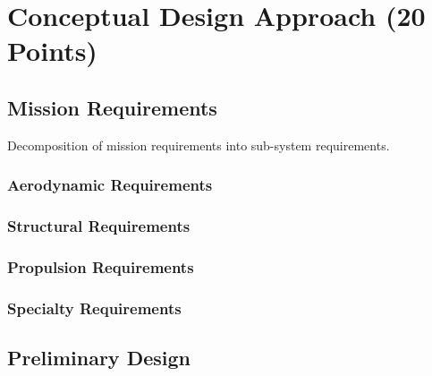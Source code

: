 \documentclass[proposal]{byu-aero}
\begin{document}
\section{Conceptual Design Approach (20 Points)}
\label{sec:ConceptualDesign}

\subsection{Mission Requirements}
\label{ssec:missionreqs}

Decomposition of mission requirements into sub-system requirements.

\subsubsection{Aerodynamic Requirements}
\label{sssec:aeroreqs}

\subsubsection{Structural Requirements}
\label{sssec:structreqs}

\subsubsection{Propulsion Requirements}
\label{sssec:propreqs}

\subsubsection{Specialty Requirements} %
\label{sssec:specialreqs}

\subsection{Preliminary Design}
\label{ssec:preliminarydesign}
\end{document}
